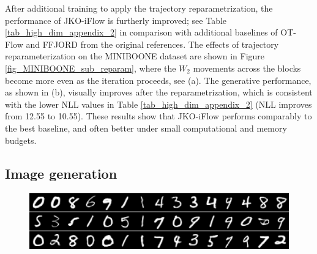 \documentclass{article}
\theoremstyle{remark}
\theoremstyle{plain}
\newcommand{\JKO}{JKO-iFlow}
\newcommand{\revold}[1]{{\color{black}#1}}
\begin{document}
{After additional training to apply the trajectory reparametrization, the performance of \JKO{} is furtherly improved; see Table \ref{tab_high_dim_appendix_2} in comparison with additional baselines of OT-Flow and FFJORD from the original references.
The effects of trajectory reparameterization on the MINIBOONE dataset are shown in Figure \ref{fig_MINIBOONE_sub_reparam},
where the $W_2$ movements across the blocks become more even as the iteration proceeds, see (a). The generative performance, as shown in (b), visually improves after the reparametrization, which is consistent with the lower NLL values in Table \ref{tab_high_dim_appendix_2} (NLL improves from 12.55 to 10.55). 
%
These results show that \JKO{} 
performs \revold{comparably to the best baseline},
and often better under small computational and memory budgets.



\revold{


\subsection{Image generation}\label{sec:img_gen}
% 
\begin{figure}[!t]
    \begin{center}
    \begin{minipage}{0.9\textwidth}
        \includegraphics[width=\linewidth]{MNIST_block_6.png}
        

\end{minipage}
\end{center}
\end{figure}}}
\end{document}
